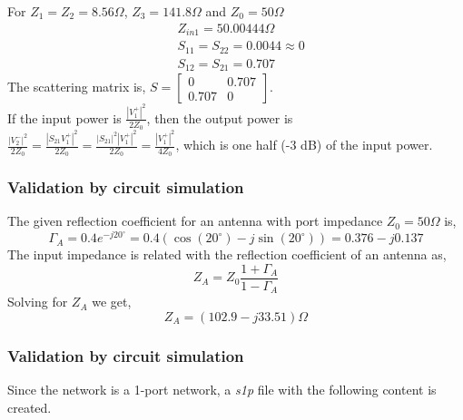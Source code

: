 \documentclass{lab_sheet}
\newcommand\ddfrac[2]{{\displaystyle\frac{\displaystyle #1}{\displaystyle #2}}}
\begin{document}
For $Z_1=Z_2=8.56\Omega$, $Z_3=141.8\Omega$ and $Z_0=50\Omega$
\begin{equation*}
    \begin{aligned}
        &Z_{in1}=50.00444\Omega\\
        &S_{11}=S_{22}=0.0044\approx0\\
        &S_{12}=S_{21}=0.707
    \end{aligned}
\end{equation*}
The scattering matrix is,
    $S=\begin{bmatrix}
        0&0.707\\
        0.707&0
    \end{bmatrix}$.\\
If the input power is $\ddfrac{|V_1^+|^2}{2Z_0}$, then the output power is $\ddfrac{|V_2^-|^2}{2Z_0}=\ddfrac{|S_{21}V_1^+|^2}{2Z_0}=\ddfrac{|S_{21}|^2|V_1^+|^2}{2Z_0}=\ddfrac{|V_1^+|^2}{4Z_0}$, which is one half (-3 dB) of the input power.
\subsubsection*{Validation by circuit simulation}
The given reflection coefficient for an antenna with port impedance $Z_0=50\Omega$ is,
\begin{equation*}
        \Gamma_A=0.4e^{-j20^\circ}= 0.4 (\cos(20^\circ)-j \sin(20^\circ))=0.376-j0.137
\end{equation*}
The input impedance is related with the reflection coefficient of an antenna as,
\begin{equation*}
    Z_A=Z_0\frac{1+\Gamma_A}{1-\Gamma_A}
\end{equation*}
Solving for $Z_A$ we get,
\begin{equation*}
    Z_A=(102.9-j33.51)\Omega
\end{equation*}

\subsubsection*{Validation by circuit simulation}
Since the network is a 1-port network, a \textit{s1p} file with the following content is created.


\end{document}
